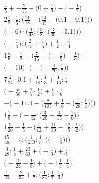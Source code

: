 \documentclass[8pt]{article}
\begin{document}
\begin{align}
\frac{4}{5} + -\frac{2}{15} - \big(0 + \frac{1}{6}\big) - \big(-\frac{1}{2}\big) \\
2\frac{1}{2} \cdot \frac{1}{5} : \bigg(\frac{11}{18} - \Big(\frac{14}{45} - \big(0.1 + 0.1\big)\Big)\bigg) \\
\bigg(-6\bigg) \cdot \bigg(\frac{1}{48} : \Big(\frac{3}{8} \cdot \big(\frac{13}{30} - 0.1\big)\Big)\bigg) \\
\big(-\frac{1}{4}\big) : \big(\frac{2}{15} + \frac{1}{5}\big) + \frac{1}{2} - \frac{1}{4} \\
1\frac{5}{6} - \frac{1}{2} - \Big(\frac{7}{15} - \big(-\frac{1}{5}\big) - \frac{1}{3}\Big) \\
\Big(-10\Big) \cdot \Big(-\big(-\frac{1}{70} : \frac{1}{7}\big)\Big) \\
7\frac{2}{24} \cdot 0.1 + \frac{1}{18} : \frac{1}{3} + \frac{1}{16} : \frac{1}{2} \\
\big(-\frac{55}{56} + \frac{2}{7} \cdot \frac{1}{2}\big) + \frac{6}{8} \cdot \frac{1}{6} \\
-\bigg(-11.1 - \Big(\frac{8}{105} + \frac{1}{6} - \big(\frac{1}{28} : \frac{1}{4}\big)\Big)\bigg) \\
1\frac{1}{8} + \Big(-\frac{1}{32} : \big(\frac{3}{20} + \frac{4}{15} - \frac{1}{6}\big)\Big) \\
1\frac{9}{20} - \frac{1}{5} - \Big(\frac{1}{12} + \frac{11}{30} - \big(\frac{2}{5} \cdot \frac{1}{2}\big)\Big) \\
\frac{15}{56} - \frac{1}{7} : \bigg(\frac{1}{240} : \frac{1}{5} : \Big(\big(-\frac{1}{6}\big)\Big)\bigg) \\
\frac{3}{28} : \frac{1}{8} + \frac{23}{63} + \big(-\frac{1}{3}\big) + \frac{1}{9} \\
\big(-\frac{19}{24} - \frac{1}{8}\big) + \big(-1\frac{1}{3} \cdot \frac{1}{4}\big) \\
\frac{1}{20} + \frac{2}{35} + \frac{1}{7} : \big(\frac{1}{84} : \frac{1}{7} : \frac{1}{3}\big)
\end{align}
\end{document}
